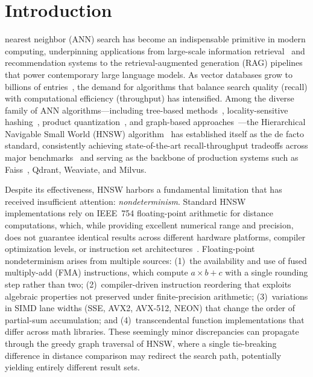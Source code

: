 \documentclass[10pt,journal]{IEEEtran}
\newcommand{\hnsw}{\textsc{HNSW}}
\begin{document}
\section{Introduction}
 nearest neighbor (ANN) search has become an indispensable primitive in modern computing, underpinning applications from large-scale information retrieval~\cite{jegou2011pq} and recommendation systems to the retrieval-augmented generation (RAG) pipelines that power contemporary large language models. As vector databases grow to billions of entries~\cite{simhadri2022neurips}, the demand for algorithms that balance search quality (recall) with computational efficiency (throughput) has intensified. Among the diverse family of ANN algorithms---including tree-based methods~\cite{bentley1975kdtree}, locality-sensitive hashing~\cite{gionis1999lsh}, product quantization~\cite{jegou2011pq}, and graph-based approaches~\cite{malkov2014nsw}---the Hierarchical Navigable Small World (\hnsw{}) algorithm~\cite{malkov2020hnsw} has established itself as the de facto standard, consistently achieving state-of-the-art recall-throughput tradeoffs across major benchmarks~\cite{simhadri2022neurips} and serving as the backbone of production systems such as Faiss~\cite{douze2024faiss}, Qdrant, Weaviate, and Milvus.

Despite its effectiveness, \hnsw{} harbors a fundamental limitation that has received insufficient attention: \emph{nondeterminism}. Standard \hnsw{} implementations rely on IEEE~754 floating-point arithmetic for distance computations, which, while providing excellent numerical range and precision, does not guarantee identical results across different hardware platforms, compiler optimization levels, or instruction set architectures~\cite{goldberg1991float}. Floating-point nondeterminism arises from multiple sources: (1)~the availability and use of fused multiply-add (FMA) instructions, which compute $a \times b + c$ with a single rounding step rather than two; (2)~compiler-driven instruction reordering that exploits algebraic properties not preserved under finite-precision arithmetic; (3)~variations in SIMD lane widths (SSE, AVX2, AVX-512, NEON) that change the order of partial-sum accumulation; and (4)~transcendental function implementations that differ across math libraries. These seemingly minor discrepancies can propagate through the greedy graph traversal of \hnsw{}, where a single tie-breaking difference in distance comparison may redirect the search path, potentially yielding entirely different result sets.
\end{document}
